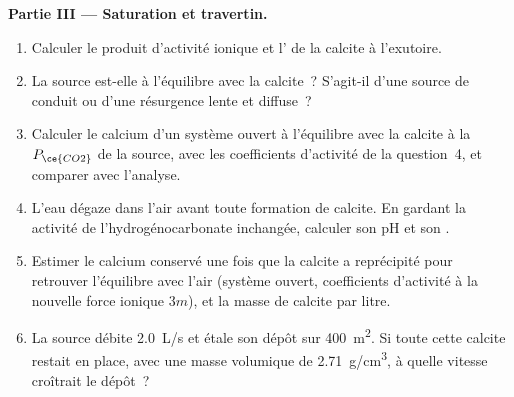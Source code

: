 \begin{problem}
\medskip\noindent\textbf{Partie III --- Saturation et travertin.}
\begin{enumerate}[resume]
\item Calculer le produit d'activité ionique et l' de la calcite
  à l'exutoire.
\item La source est-elle à l'équilibre avec la calcite~? S'agit-il d'une source de conduit ou
  d'une résurgence lente et diffuse~?
\item Calculer le calcium d'un système ouvert à l'équilibre avec la calcite à
  la $P_{\ce{CO2}}$ de la source, avec les coefficients d'activité de la question~4,
  et comparer avec l'analyse.
\item L'eau dégaze dans l'air avant toute formation de calcite. En gardant la
  activité de l'hydrogénocarbonate inchangée, calculer son pH et son .
\item Estimer le calcium conservé une fois que la calcite a reprécipité pour
  retrouver l'équilibre avec l'air (système ouvert, coefficients d'activité à la nouvelle
  force ionique $3m$), et la masse de calcite par litre.
\item La source débite \qty{2.0}{L/s} et étale son dépôt sur
  \qty{400}{m^2}. Si toute cette calcite restait en place, avec une masse volumique de
  \qty{2.71}{g/cm^3}, à quelle vitesse croîtrait le dépôt~?
\end{enumerate}


\end{problem}
